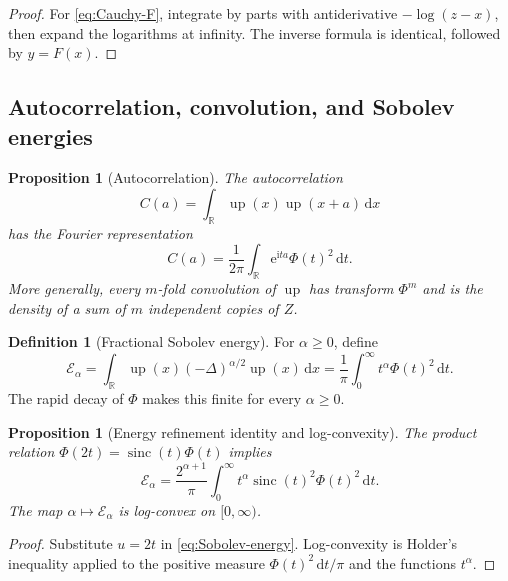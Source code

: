 \documentclass[11pt]{article}
\newtheorem{proposition}[theorem]{Proposition}
\theoremstyle{definition}
\newtheorem{definition}[theorem]{Definition}
\theoremstyle{remark}
\newcommand{\R}{\mathbb R}
\newcommand{\dd}{\,\mathrm d}
\newcommand{\ii}{\mathrm i}
\newcommand{\e}{\mathrm e}
\newcommand{\Up}{\operatorname{up}}
\newcommand{\sinc}{\operatorname{sinc}}
\newcommand{\Phiup}{\Phi}
\begin{document}
\begin{proof}
For \cref{eq:Cauchy-F}, integrate by parts with antiderivative $-\log(z-x)$, then expand the
logarithms at infinity.  The inverse formula is identical, followed by $y=F(x)$.
\end{proof}

\subsection{Autocorrelation, convolution, and Sobolev energies}

\begin{proposition}[Autocorrelation]
\label{prop:autocorrelation}
The autocorrelation
\begin{equation}
 C(a)=\int_{\R}\Up(x)\Up(x+a)\dd x
 \label{eq:autocorrelation-def}
\end{equation}
has the Fourier representation
\begin{equation}
 C(a)=\frac1{2\pi}\int_{\R}\e^{\ii ta}\Phiup(t)^2\dd t.
 \label{eq:autocorrelation-Fourier}
\end{equation}
More generally, every $m$-fold convolution of $\Up$ has transform $\Phiup^m$ and is the
density of a sum of $m$ independent copies of $Z$.
\end{proposition}

\begin{definition}[Fractional Sobolev energy]
For $\alpha\ge0$, define
\begin{equation}
 \mathcal E_\alpha
 =\int_{\R}\Up(x)(-\Delta)^{\alpha/2}\Up(x)\dd x
 =\frac1\pi\int_0^{\infty}t^\alpha\Phiup(t)^2\dd t.
 \label{eq:Sobolev-energy}
\end{equation}
The rapid decay of $\Phiup$ makes this finite for every $\alpha\ge0$.
\end{definition}

\begin{proposition}[Energy refinement identity and log-convexity]
\label{prop:energy-refinement}
The product relation $\Phiup(2t)=\sinc(t)\Phiup(t)$ implies
\begin{equation}
 \mathcal E_\alpha
 =\frac{2^{\alpha+1}}\pi\int_0^{\infty}
 t^\alpha\sinc(t)^2\Phiup(t)^2\dd t.
 \label{eq:energy-refinement}
\end{equation}
The map $\alpha\mapsto\mathcal E_\alpha$ is log-convex on $[0,\infty)$.
\end{proposition}

\begin{proof}
Substitute $u=2t$ in \cref{eq:Sobolev-energy}.  Log-convexity is Holder's inequality applied
to the positive measure $\Phiup(t)^2\dd t/\pi$ and the functions $t^\alpha$.
\end{proof}
\end{document}
